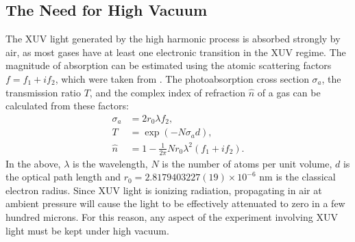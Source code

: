 \subsection{The Need for High Vacuum}

The XUV light generated by the high harmonic process is absorbed strongly by air, as most gases have at least one electronic transition in the XUV regime. The magnitude of absorption can be estimated using the atomic scattering factors $f = f_1 + i f_2$, which were taken from \cite{henkeXRayInteractionsPhotoabsorption1993}. The photoabsorption cross section $\sigma_a$, the transmission ratio $T$, and the complex index of refraction $\hat{n}$ of a gas can be calculated from these factors:
\begin{align}
\sigma_a &= 2 r_0 \lambda f_2 \label{eqn:PhotoCrossSection}, \\
T &= \exp\left( -N \sigma_a d \right) \label{eqn:BeersLaw}, \\
\hat{n} &= 1 - \frac{1}{2 \pi} N r_0 \lambda^2 \left(f_1 + i f_2\right). \label{eqn:IndexfromASF}
\end{align}
In the above, $\lambda$ is the wavelength, $N$ is the number of atoms per unit volume, $d$ is the optical path length and $r_0=2.8179403227(19) \times 10^{-6} \text{ nm}$ is the classical electron radius. Since XUV light is ionizing radiation, propagating in air at ambient pressure will cause the light to be effectively attenuated to zero in a few hundred microns. For this reason, any aspect of the experiment involving XUV light must be kept under high vacuum.

